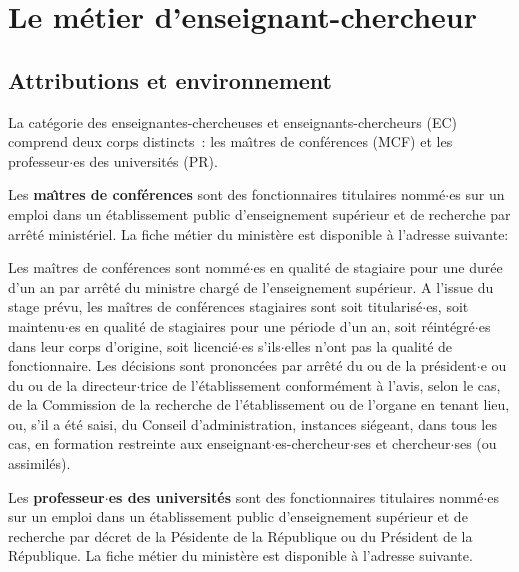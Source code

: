 \chapter{Le m\'etier d'enseignant-chercheur}


\section{Attributions et environnement}
La cat\'egorie des enseignantes-chercheuses et enseignants-chercheurs (EC) comprend deux corps distincts~:
les ma\^\i tres de conf\'erences (MCF) et les professeur$\cdot$es des universit\'es (PR). 

\medskip

Les \textbf{ma\^\i  tres de conf\'erences} sont des fonctionnaires titulaires
nomm\'e$\cdot$es sur un emploi dans un \'etablisse\-ment public d'enseignement
sup\'erieur et de recherche par arr\^et\'e minist\'eriel. La fiche m\'etier du minist\`ere est disponible \`a l'adresse suivante:

{}

Les ma\^itres de conf\'erences sont nomm\'e$\cdot$es en qualit\'e de stagiaire pour une dur\'ee d'un an par arr\^ et\'e du ministre charg\'e de l'enseignement sup\'erieur.
A l'issue du stage pr\'evu, les ma\^itres de conf\'erences stagiaires sont soit titularis\'e$\cdot$es, soit maintenu$\cdot$es en qualit\'e de stagiaires pour une p\'eriode d'un an, soit r\'eint\'egr\'e$\cdot$es dans leur corps d'origine, soit licenci\'e$\cdot$es s'ils$\cdot$elles n'ont pas la qualit\'e de fonctionnaire. Les d\'ecisions sont prononc\'ees par arr\^ et\'e du ou de la pr\'esident$\cdot$e ou du ou de la directeur$\cdot$trice de l'\'etablissement conform\'ement \`a l'avis, selon le cas, de la Commission de la recherche de l'\'etablissement ou de l'organe en tenant lieu, ou, s'il a \'et\'e saisi, du Conseil d'administration, instances si\'egeant, dans tous les cas, en formation restreinte aux enseignant$\cdot$es-chercheur$\cdot$ses et chercheur$\cdot$ses (ou assimil\'es).

\medskip

Les \textbf{professeur$\cdot$es des universit\'es} sont des fonctionnaires titulaires
nomm\'e$\cdot$es sur un emploi dans un \'etablissement public d'enseignement
sup\'erieur et de recherche par d\'ecret de la P\'esidente de la R\'epublique ou du Pr\'esident de la R\'e\-pu\-bli\-que.
La fiche m\'etier du minist\`ere est disponible \`a l'adresse suivante.

